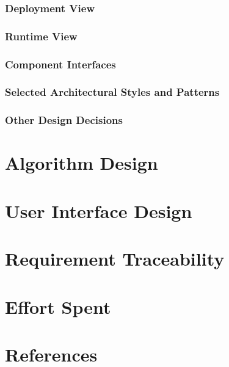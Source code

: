 \documentclass{article}
\begin{document}
\subsubsection{Deployment View}  %
\subsubsection{Runtime View} %
\subsubsection{Component Interfaces} %
\subsubsection{Selected Architectural Styles and Patterns} %
\subsubsection{Other Design Decisions} %

\section{Algorithm Design} %
\section{User Interface Design} %
\section{Requirement Traceability} %
\section{Effort Spent} %
\section{References} %
\end{document}
